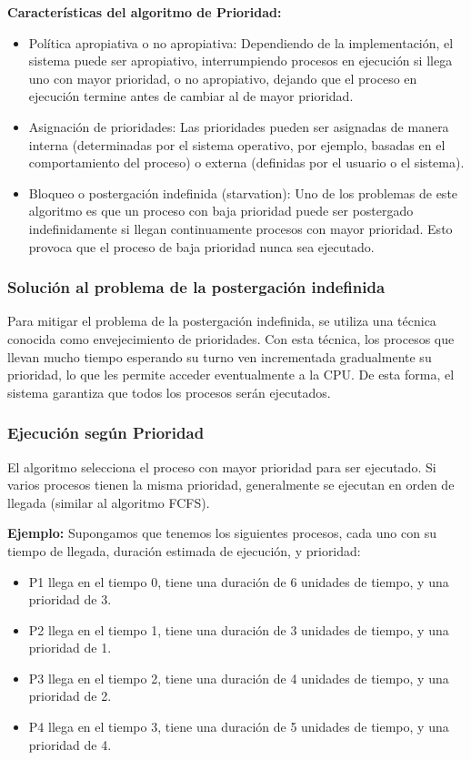 \textbf{Características del algoritmo de Prioridad:} 
\begin{itemize} 
	\item Política apropiativa o no apropiativa: Dependiendo de la implementación, el sistema puede ser apropiativo, interrumpiendo procesos en ejecución si llega uno con mayor prioridad, o no apropiativo, dejando que el proceso en ejecución termine antes de cambiar al de mayor prioridad. 
	\item Asignación de prioridades: Las prioridades pueden ser asignadas de manera interna (determinadas por el sistema operativo, por ejemplo, basadas en el comportamiento del proceso) o externa (definidas por el usuario o el sistema). 
	\item Bloqueo o postergación indefinida (starvation): Uno de los problemas de este algoritmo es que un proceso con baja prioridad puede ser postergado indefinidamente si llegan continuamente procesos con mayor prioridad. Esto provoca que el proceso de baja prioridad nunca sea ejecutado.
\end{itemize}

\subsubsection{Solución al problema de la postergación indefinida}

Para mitigar el problema de la postergación indefinida, se utiliza una técnica conocida como envejecimiento de prioridades. Con esta técnica, los procesos que llevan mucho tiempo esperando su turno ven incrementada gradualmente su prioridad, lo que les permite acceder eventualmente a la CPU. De esta forma, el sistema garantiza que todos los procesos serán ejecutados.

\subsubsection{Ejecución según Prioridad}

El algoritmo selecciona el proceso con mayor prioridad para ser ejecutado. Si varios procesos tienen la misma prioridad, generalmente se ejecutan en orden de llegada (similar al algoritmo FCFS).

\textbf{Ejemplo:} Supongamos que tenemos los siguientes procesos, cada uno con su tiempo de llegada, duración estimada de ejecución, y prioridad:

\begin{itemize} 
	\item P1 llega en el tiempo 0, tiene una duración de 6 unidades de tiempo, y una prioridad de 3.
	\item P2 llega en el tiempo 1, tiene una duración de 3 unidades de tiempo, y una prioridad de 1. 
	\item P3 llega en el tiempo 2, tiene una duración de 4 unidades de tiempo, y una prioridad de 2.
	\item P4 llega en el tiempo 3, tiene una duración de 5 unidades de tiempo, y una prioridad de 4.
\end{itemize}

